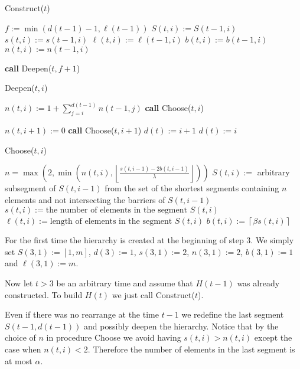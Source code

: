 \documentclass{llncs}
\newcommand{\hb}[2]{b\left(#1, #2\right)}
\newcommand{\hn}[2]{n\left(#1, #2\right)}
\newcommand{\hs}[2]{s\left(#1, #2\right)}
\newcommand{\hS}[2]{S\left(#1, #2\right)}
\newcommand{\hH}[1]{H\left(#1\right)}
\newcommand{\hl}[2]{\ell(#1, #2)}
\newcommand{\htz}{3}
\newcommand{\rl}[1]{\ell\left(#1\right)}
\begin{document}
\begin{algorithm}
\caption{Construct($t$)}
\label{alg:construct}
\begin{algorithmic}
\STATE $f := \min(d(t - 1) - 1, \rl{t - 1})$
	\STATE $\hS{t}{i} := \hS{t - 1}{i}$
	\STATE $\hs{t}{i} := \hs{t - 1}{i}$
	\STATE $\hl{t}{i} := \hl{t - 1}{i}$
	\STATE $\hb{t}{i} := \hb{t - 1}{i}$
	\STATE $\hn{t}{i} := \hn{t - 1}{i}$
\ENDFOR

\STATE \textbf{call } Deepen($t, f + 1$)
\end{algorithmic}
\end{algorithm}

\begin{algorithm}
\caption{Deepen($t, i$)}
\label{alg:deepen}
\begin{algorithmic}
\STATE $\hn{t}{i} := 1 + \sum_{j = i}^{d(t - 1)} \hn{t - 1}{j}$
\STATE \textbf{call} Choose($t, i$)

\IF {$\hs{t}{i} \geq \alpha$}
	\STATE $\hn{t}{i + 1} := 0$
	\STATE \textbf{call} Choose($t, i + 1$)
	\STATE $d(t) := i + 1$
\ELSE
	\STATE $d(t) := i$
\ENDIF
\end{algorithmic}
\end{algorithm}

\begin{algorithm}
\caption{Choose($t, i$)}
\label{alg:choose}
\begin{algorithmic}
\STATE $n = \max\left(2 , \min\left(\hn{t}{i}, \left\lfloor \frac{\hs{t}{i - 1} - 2\hb{t}{i - 1}}{\lambda}\right\rfloor\right)\right)$
\STATE $\hS{t}{i} := $ arbitrary subsegment of $\hS{t}{i - 1}$ from the set of the shortest segments containing $n$ elements and not intersecting the barriers of $\hS{t}{i - 1}$
\STATE $\hs{t}{i} := \mbox{the number of elements in the segment }\hS{t}{i}$
\STATE $\hl{t}{i} := \mbox{length of elements in the segment }\hS{t}{i}$
\STATE $\hb{t}{i} := \left\lceil \beta \hs{t}{i} \right\rceil$
\end{algorithmic}
\end{algorithm}

For the first time the hierarchy is created at the beginning of step $\htz$.
We simply set $\hS{\htz}{1} := [1, m]$, $d(\htz) := 1$, $\hs{\htz}{1} := 2$, $\hn{\htz}{1} := 2$, $\hb{\htz}{1} := 1$ and $\hl{\htz}{1} := m$.

Now let $t > \htz$ be an arbitrary time and assume that $\hH{t - 1}$ was already constructed.
To build $\hH{t}$ we just call Construct($t$).

Even if there was no rearrange at the time $t - 1$ we redefine the last segment $\hS{t - 1}{d(t - 1)}$ and possibly deepen the hierarchy.
Notice that by the choice of $n$ in procedure Choose we avoid having $\hs{t}{i} > \hn{t}{i}$ except the case when $\hn{t}{i} < 2$.
Therefore the number of elements in the last segment is at most $\alpha$.
\end{document}
